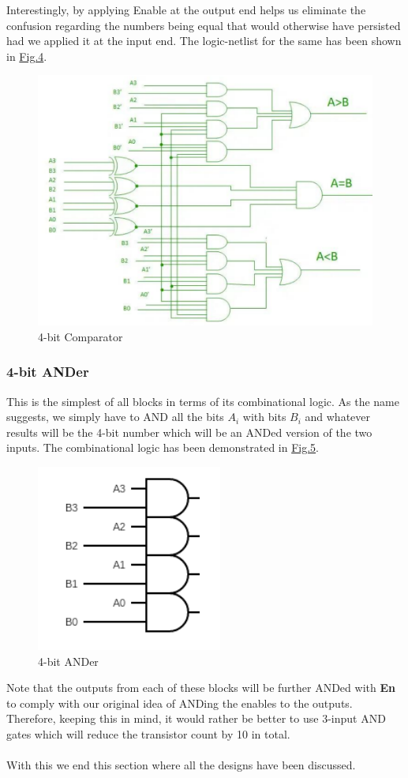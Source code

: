 \documentclass[a4paper, titlepage]{article}
\begin{document}
Interestingly, by applying Enable at the output end helps us eliminate the confusion regarding the numbers being equal that 
would otherwise have persisted had we applied it at the input end. The logic-netlist for the same has been shown in 
\hyperlink{4C}{Fig.4}.
\begin{figure}[htp]
    \centering
    \hypertarget{4C}{\includegraphics[scale = 0.6]{Image_4-bit_Comparator.png}}
    \caption{4-bit Comparator}
    \label{fig:fig3}
\end{figure}

\subsubsection{4-bit ANDer}
This is the simplest of all blocks in terms of its combinational logic. As the name suggests, we simply have to AND all
the bits $A_i$ with bits $B_i$ and whatever results will be the 4-bit number which will be an ANDed version of the two inputs.
The combinational logic has been demonstrated in \hyperlink{4A}{Fig.5}.
\begin{figure}[htp]
    \centering
    \hypertarget{4A}{\includegraphics[scale = 1]{Image_4-bit_ANDer.png}}
    \caption{4-bit ANDer}
    \label{fig:fig4}
\end{figure}
Note that the outputs from each of these blocks will be further ANDed with \textbf{En} to comply with 
our original idea of ANDing the enables to the outputs. Therefore, keeping this in mind, it would rather be better 
to use 3-input AND gates which will reduce the transistor count by 10 in total.
\\\\
With this we end this section where all the designs have been discussed.
\end{document}
